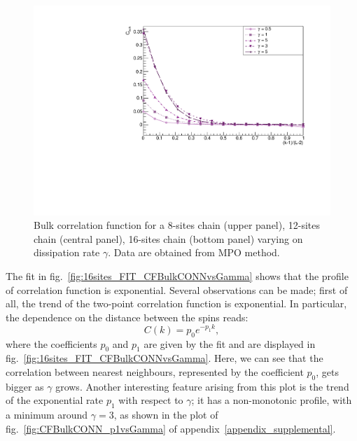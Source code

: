 \begin{figure}
    \includegraphics[scale=0.55]{Figures/16sites_CFBulkCONNVSgamma.pdf}
\captionsetup{width=1.\linewidth}
\caption{Bulk correlation function for a 8-sites chain (upper panel), 12-sites chain (central panel), 16-sites chain (bottom panel) varying on dissipation rate $\gamma$. Data are obtained from MPO method.}
\label{fig:BulkCFvsGamma3panelsSizes}
\end{figure}

The fit in fig.~\ref{fig:16sites_FIT_CFBulkCONNvsGamma} shows that the profile of correlation function is exponential. Several observations can be made; first of all, the trend of the two-point correlation function is exponential. In particular, the dependence on the distance between the spins reads:
\begin{equation}
    C(k) = p_0 e^{-p_1 k},
\end{equation}
where the coefficients $p_0$ and $p_1$ are given by the fit and are displayed in fig.~\ref{fig:16sites_FIT_CFBulkCONNvsGamma}. Here, we can see that the correlation between nearest neighbours, represented by the coefficient $p_0$, gets bigger as $\gamma$ grows. Another interesting feature arising from this plot is the trend of the exponential rate $p_1$ with respect to $\gamma$; it has a non-monotonic profile, with a minimum around $\gamma = 3$, as shown in the plot of fig.~\ref{fig:CFBulkCONN_p1vsGamma} of appendix~\ref{appendix_supplemental}. %

